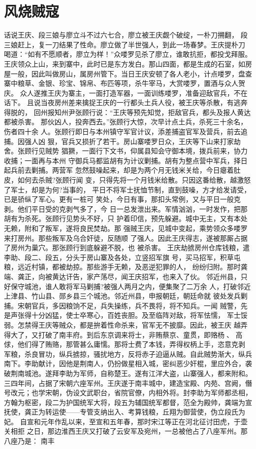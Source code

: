 \chapter{风烧贼寇~}

话说王庆、段三娘与廖立斗不过六七合，廖立被王庆觑个破绽，一朴刀搠翻，
段三娘赶上，复一刀结果了性命。廖立做了半世强人，到此一场春梦。王庆提朴刀
喝道：“如有不愿顺者，廖立为样！”众喽罗见杀了廖立，谁敢抗拒，都投戈拜服。
王庆领众上山，来到寨中，此时已是东方发白。那山四面，都是生成的石室，如房
屋一般，因此叫做房山，属房州管下。当日王庆安顿了各人老小，计点喽罗，盘查
寨中粮草、金银、珍宝、锦帛、布匹等项，杀牛宰马，大赏喽罗，置酒与众人贺庆。
众人遂推王庆为寨主，一面打造军器，一面训练喽罗，准备迎敌官兵，不在话下。
且说当夜房州差来擒捉王庆的一行都头土兵人役，被王庆等杀散，有逃奔得脱的，
回州报知州尹张顾行说：“王庆等预先知觉，拒敌官兵，都头及报人黄达都被杀害。
那伙凶人，投奔西去。”张顾行大惊，次早计点土兵，杀死三十余名，伤者四十余
人。张顾行即日与本州镇守军官计议，添差捕盗官军及营兵，前去追捕。因强人凶
狠，官兵又损折了若干。房山寨喽罗日众，王庆等下山来打家劫舍。张顾行见贼势
猖獗，一面行下文书，仰属县知会守御本境，拨兵前来，协力收捕；一面再与本州
守御兵马都监胡有为计议剿捕。胡有为整点营中军兵，择日起兵前去剿捕。两营军
忽然鼓噪起来，却是为两个月无钱米关给，今日瘪着肚皮，如何去杀贼?张顾行闻
变，只得先将一个月钱米给散。只因这番给散，越激怒了军士，却是为何?当事的，
平日不将军士抚恤节制，直到鼓噪，方才给发请受，已是骄纵了军心。更有一桩可
笑处，今日有事，那扣头常例，又与平日一般克剥。他们平日受的克剥气多了，今
日一总发泄出来。军情汹汹，一时发作，把那胡有为杀死。张顾行见势头不好，只
护着印信，预先躲避。城中无主，又有本处无赖，附和了叛军，遂将良民焚劫。那
强贼王庆，见城中变起，乘势领众多喽罗来打房州。那些叛军及乌合奸徒，反随顺
了强人。因此王庆得志，遂被那厮占据了房州为巢穴。那张顾行到底躲避不脱，也
被杀害。
王庆劫掳房州仓库钱粮，遣李助、段二、段五，分头于房山寨及各处，立竖招军旗
号，买马招军，积草屯粮，远近村镇，都被劫掠。那些游手无赖，及恶逆犯罪的人，
纷纷归附。那时龚端、龚正，向被黄达讦告，家产荡尽，闻王庆招军，也来入了伙。
邻近州县，只好保守城池，谁人敢将军马剿捕?被强人两月之内，便集聚了二万余
人，打破邻近上津县、竹山县、郧乡县三个城池。邻近州县，申报朝廷，朝廷命就
彼处发兵剿捕。宋朝官兵，多因粮饷不足，兵失操练，兵不畏将，将不知兵。一闻
贼警，先是声张得十分凶猛，使士卒寒心，百姓丧胆。及至临阵对敌，将军怯懦，
军士馁弱。怎禁得王庆等贼众，都是拚着性命杀来，官军无不披靡。因此，被王庆
越弄得大了，又打破了南丰府。到后东京调来将士，非贿蔡京、童贯，即赂杨、
高俅，他们得了贿赂，那管甚么庸懦。那将士费了本钱，弄得权柄上手，恣意克剥
军粮，杀良冒功，纵兵掳掠，骚扰地方，反将赤子迫逼从贼。自此贼势渐大，纵兵
南下。李助献计，因他是荆南人，仍扮做星相入城，密纠恶少奸棍，里应外合，袭
破荆南城池。遂拜李助为军师，自称楚王。遂有江洋大盗，山寨强人，都来附和。
三四年间，占据了宋朝六座军州。王庆遂于南丰城中，建造宝殿、内苑、宫阙，僭
号改元；也学宋朝，伪设文武职台，省院官僚，内相外将。封李助为军师都丞相，
方翰为枢密，段二为护国统军大将，段五为辅国统军都督，范全为殿帅，龚端为宣
抚使，龚正为转运使——专管支纳出入、考算钱粮，丘翔为御营使，伪立段氏为妃。
自宣和元年作乱以来，至宣和五年春，那时宋江等正在河北征讨田虎，于壶关相拒
之日，那边淮西王庆又打破了云安军及宛州，一总被他占了八座军州。那八座乃是：
南丰

